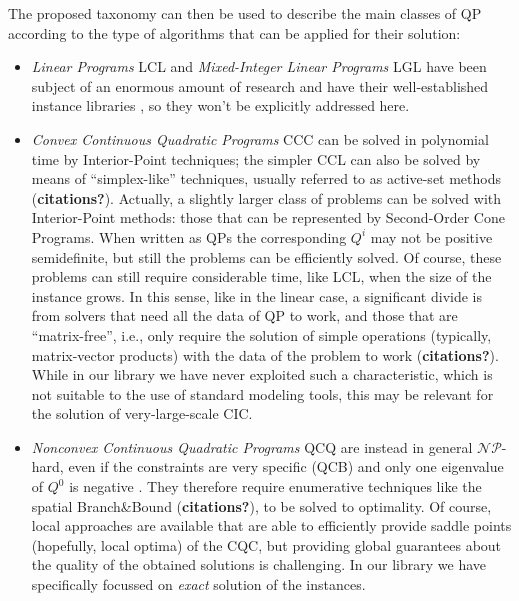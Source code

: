 The proposed taxonomy can then be used to describe the main classes of QP according to the type of algorithms that can be applied for their solution:
%
\begin{itemize}
 \item \emph{Linear Programs} LCL and \emph{Mixed-Integer Linear Programs} LGL have been subject of an enormous amount of research and have their well-established instance libraries \cite{Koch2011}, so they won't be explicitly addressed here.
 \item \emph{Convex Continuous Quadratic Programs} CCC can be solved in polynomial time by Interior-Point techniques; the simpler CCL can also be solved by means of ``simplex-like'' techniques, usually referred to as active-set methods ({\bf citations?}). Actually, a slightly larger class of problems can be solved with Interior-Point methods: those that can be represented by Second-Order Cone Programs. When written as QPs the corresponding $Q^i$ may not be positive semidefinite, but still the problems can be efficiently solved. Of course, these problems can still require considerable time, like LCL, when the size of the instance grows. In this sense, like in the linear case, a significant divide is from solvers that need all the data of QP to work, and those that are ``matrix-free'', i.e., only require the solution of simple operations (typically, matrix-vector products) with the data of the problem to work ({\bf citations?}). While in our library we have never exploited such a characteristic, which is not suitable to the use of standard modeling tools, this may be relevant for the solution of very-large-scale CIC.
 \item \emph{Nonconvex Continuous Quadratic Programs} QCQ are instead in general $\mathcal{NP}$-hard, even if the constraints are very specific (QCB) and only one eigenvalue of $Q^0$ is negative \cite{Hemmecke2010}. They therefore require enumerative techniques like the spatial Branch\&Bound ({\bf citations?}), to be solved to optimality. Of course, local approaches are available that are able to efficiently provide saddle points (hopefully, local optima) of the CQC, but providing global guarantees about the quality of the obtained solutions is challenging. In our library we have specifically focussed on  \emph{exact} solution of the instances.

\end{itemize}
